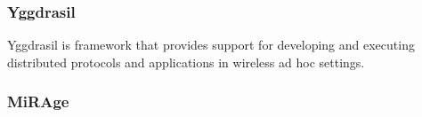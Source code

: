 

\subsubsection{Yggdrasil}
\label{subsubsection:Yggdrasil}
Yggdrasil \cite{Costa2018} is framework that provides support
for developing and executing distributed protocols and applications in wireless ad
hoc settings.


\subsubsection{MiRAge}
\label{subsubsection:mirage}



